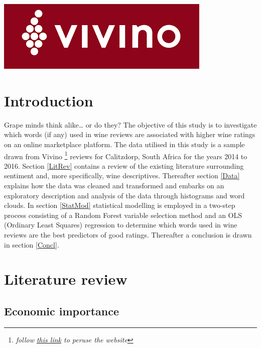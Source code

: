 \documentclass[11pt,preprint]{elsarticle}
\numberwithin{equation}{section}
\numberwithin{figure}{section}
\numberwithin{table}{section}
\let\rmarkdownfootnote\footnote%
\def\footnote{\protect\rmarkdownfootnote}
\begin{document}
\headsep 35pt %




\newpage

\begin{center}\includegraphics[width=0.8\linewidth]{writeup/vivino} \end{center}

\section{Introduction}\label{introduction}

\label{Intro}

Grape minds think alike\ldots{} or do they? The objective of this study
is to investigate which words (if any) used in wine reviews are
associated with higher wine ratings on an online marketplace platform.
The data utilised in this study is a sample drawn from Vivino
\footnote{\emph{follow \href{https://www.vivino.com/}{this link} to
  peruse the website}} reviews for Calitzdorp, South Africa for the
years 2014 to 2016. Section \ref{LitRev} contains a review of the
existing literature surrounding sentiment and, more specifically, wine
descriptives. Thereafter section \ref{Data} explains how the data was
cleaned and transformed and embarks on an exploratory description and
analysis of the data through histograms and word clouds. In section
\ref{StatMod} statistical modelling is employed in a two-step process
consisting of a Random Forest variable selection method and an OLS
(Ordinary Least Squares) regression to determine which words used in
wine reviews are the best predictors of good ratings. Thereafter a
conclusion is drawn in section \ref{Concl}.

\newpage

\section{Literature review}\label{literature-review}

\label{LitRev}

\subsection{Economic importance}\label{economic-importance}
\end{document}
